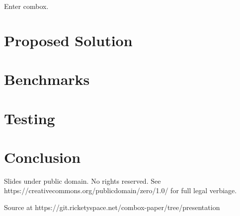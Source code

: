 \documentclass[17pt]{beamer}
\begin{document}
\begin{frame}
  \centering
  Enter combox.
\end{frame}

\section{Proposed Solution}
\section{Benchmarks}
\section{Testing}
\section{Conclusion}

\begin{frame}[fragile]

  {\tiny
  \begin{semiverbatim}
    Slides under public domain. No rights reserved.
    See https://creativecommons.org/publicdomain/zero/1.0/ for full legal
    verbiage.

    Source at https://git.ricketyspace.net/combox-paper/tree/presentation
  \end{semiverbatim}
  }
\end{frame}
\end{document}
